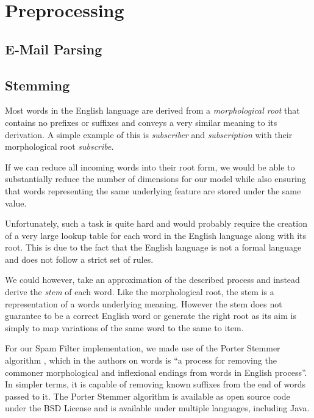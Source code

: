 \section{Preprocessing}

\subsection{E-Mail Parsing}

\subsection{Stemming}
Most words in the English language are derived from a {\it morphological root} that contains no prefixes or suffixes and conveys a very similar meaning to its derivation. A simple example of this is {\it subscriber} and {\it subscription} with their morphological root {\it subscribe}. 

If we can reduce all incoming words into their root form, we would be able to substantially reduce the number of dimensions for our model while also ensuring that words representing the same underlying feature are stored under the same value.

Unfortunately, such a task is quite hard and would probably require the creation of a very large lookup table for each word in the English language along with its root. This is due to the fact that the English language is not a formal language and does not follow a strict set of rules. 

We could however, take an approximation of the described process and instead derive the {\it stem} of each word. Like the morphological root, the stem is a representation of a words underlying meaning. However the stem does not guarantee to be a correct English word or generate the right root as its aim is simply to map variations of the same word to the same to item. 

For our Spam Filter implementation, we made use of the Porter Stemmer algorithm \cite{porter1980}, which in the authors on words is ``a process for removing the commoner morphological and inflexional endings from words in English process''. In simpler terms, it is capable of removing known suffixes from the end of words passed to it. The Porter Stemmer algorithm is available as open source code under the BSD License and is available under multiple languages, including Java.

